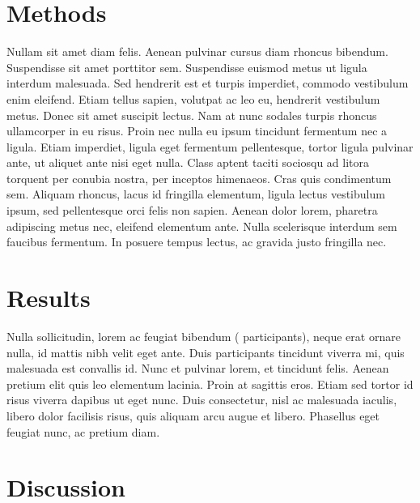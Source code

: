 \section{Methods}
\label{sec:studyone:methods}

Nullam sit amet diam felis. Aenean pulvinar cursus diam rhoncus bibendum.
Suspendisse sit amet porttitor sem.  Suspendisse euismod metus ut ligula
interdum malesuada.  Sed hendrerit est et turpis imperdiet, commodo
vestibulum enim eleifend.  Etiam tellus sapien, volutpat ac leo eu,
hendrerit vestibulum metus.  Donec sit amet suscipit lectus.  Nam at nunc
sodales turpis rhoncus ullamcorper in eu risus.  Proin nec nulla eu ipsum
tincidunt fermentum nec a ligula.  Etiam imperdiet, ligula eget fermentum
pellentesque, tortor ligula pulvinar ante, ut aliquet ante nisi eget nulla. 
Class aptent taciti sociosqu ad litora torquent per conubia nostra, per
inceptos himenaeos.  Cras quis condimentum sem.  Aliquam rhoncus, lacus id
fringilla elementum, ligula lectus vestibulum ipsum, sed pellentesque orci
felis non sapien.  Aenean dolor lorem, pharetra adipiscing metus nec,
eleifend elementum ante.  Nulla scelerisque interdum sem faucibus fermentum. 
In posuere tempus lectus, ac gravida justo fringilla nec.

\section{Results}
\label{sec:studyone:results}

Nulla sollicitudin, lorem ac feugiat bibendum (\TotalParticipantsStudyOne{} participants), neque erat ornare nulla, id
mattis nibh velit eget ante.  Duis \TotalParticipantsStudyOne{} participants tincidunt viverra mi, quis malesuada est
convallis id.  Nunc et pulvinar lorem, et tincidunt felis.  Aenean pretium
elit quis leo elementum lacinia.  Proin at sagittis eros.  Etiam sed tortor
id risus viverra dapibus ut eget nunc.  Duis consectetur, nisl ac malesuada
iaculis, libero dolor facilisis risus, quis aliquam arcu augue et libero. 
Phasellus eget feugiat nunc, ac pretium diam.

\section{Discussion}
\label{sec:studyone:discussion}


